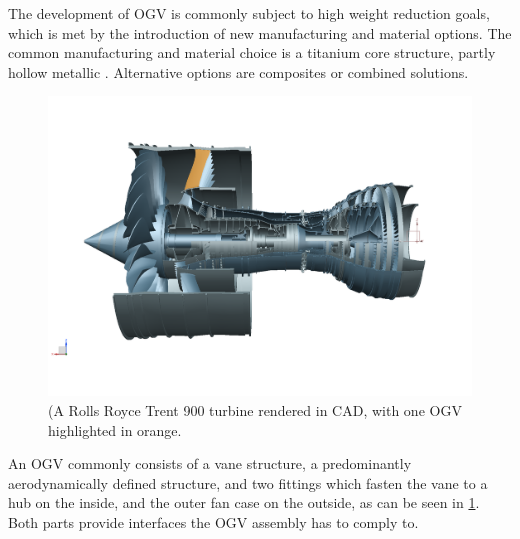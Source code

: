 \documentclass[preprints,article,accept,moreauthors,pdftex]{Definitions/mdpi}
\newcommand{\Jakob}[1]{{{\color{orange}{\itshape{#1}}\color{black}}
    }{\ignorespaces}}
\begin{document}
The development of \ac{OGV} is commonly subject to high weight reduction goals, which is met by the introduction of new manufacturing and material options.
The common manufacturing and material choice is a titanium core structure, partly hollow metallic \cite{Sjunnesson2019}.
Alternative options are composites or combined solutions.


\begin{figure}[th!]
    \begin{center}
    \centering
        \includegraphics[width=\textwidth]{figures/trent9000_OGV.png}

        \caption{(A Rolls Royce Trent 900 turbine rendered in CAD\protect\footnotemark, with one OGV highlighted in orange.
        }
        \label{fig:turbine}
    \end{center}
\end{figure}


An \ac{OGV} commonly consists of a vane structure, a predominantly aerodynamically defined structure, and two fittings which fasten the vane to a hub on the inside, and the outer fan case on the outside, as can be seen in \ref{fig:turbine}.
Both parts provide interfaces the \ac{OGV} assembly has to comply to.
\end{document}
